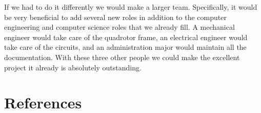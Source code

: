 \documentclass{article}
\numberwithin{equation}{section} %
\begin{document}
If we had to do it differently we would make a larger team. Specifically, it would be very beneficial to add several new roles in addition to the computer engineering and computer science roles that we already fill. A mechanical engineer would take care of the quadrotor frame, an electrical engineer would take care of the circuits, and an administration major would maintain all the documentation. With these three other people we could make the excellent project it already is absolutely outstanding.



\section{References}
\end{document}
